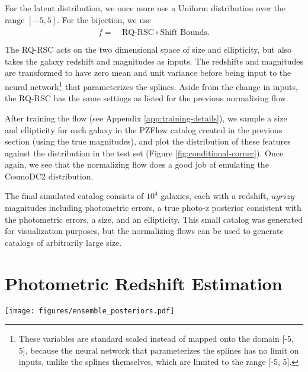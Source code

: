 \documentclass[twocolumn]{aastex631}
\begin{document}
For the latent distribution, we once more use a Uniform distribution over the range $[-5, 5]$.
For the bijection, we use
\begin{align}
    \begin{split}
        f =& ~ \text{RQ-RSC} \circ \text{Shift Bounds}. \\
    \end{split}
\end{align}
The RQ-RSC acts on the two dimensional space of size and ellipticity, but also takes the galaxy redshift and magnitudes as inputs.
The redshifts and magnitudes are transformed to have zero mean and unit variance before being input to the neural network\footnote{These variables are standard scaled instead of mapped onto the domain [-5, 5], because the neural network that parameterizes the splines has no limit on inputs, unlike the splines themselves, which are limited to the range [-5, 5].} that parameterizes the splines.
Aside from the change in inputs, the RQ-RSC has the same settings as listed for the previous normalizing flow.

After training the flow (see Appendix \ref{app:training-details}), we sample a size and ellipticity for each galaxy in the PZFlow catalog created in the previous section (using the true magnitudes), and plot the distribution of these features against the distribution in the test set (Figure \ref{fig:conditional-corner}).
Once again, we see that the normalizing flow does a good job of emulating the CosmoDC2 distribution.

The final simulated catalog consists of $10^4$ galaxies, each with a redshift, $ugrizy$ magnitudes including photometric errors, a true photo-z posterior consistent with the photometric errors, a size, and an ellipticity.
This small catalog was generated for visualization purposes, but the normalizing flows can be used to generate catalogs of arbitrarily large size.


\section{Photometric Redshift Estimation}
\label{sec:photo-z}

\begin{figure*}[t!]
    \begin{centering}
        \texttt{[image: figures/ensemble\_posteriors.pdf]}
        \caption{
            The ensemble of posteriors for three example galaxies.
            Flows 1-4 label the individual posteriors produced by each of the flows that make up the ensemble.
            The dashed black line is the mean of these individual posteriors and is the value used by the ensemble.
            The vertical gray line labeled ``Truth'' denotes the true redshift of the galaxy.
            Note these galaxies were specifically chosen for their broad, multimodal posteriors.
            The posteriors of most galaxies are unimodal with sharp peaks.
        }
        \label{fig:ensemble-posteriors}
    \end{centering}
\end{figure*}
\end{document}
